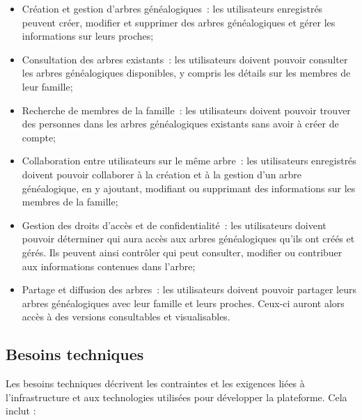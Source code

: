 \begin{itemize}

  \item Création et gestion d’arbres généalogiques : les utilisateurs enregistrés
    peuvent créer, modifier et supprimer des arbres généalogiques et gérer les
    informations sur leurs proches;

  \item Consultation des arbres existants : les utilisateurs doivent pouvoir
    consulter les arbres généalogiques disponibles, y compris les détails sur
    les membres de leur famille;

  \item Recherche de membres de la famille : les utilisateurs doivent pouvoir
    trouver des personnes dans les arbres généalogiques existants sans avoir à
    créer de compte;

  \item Collaboration entre utilisateurs sur le même arbre : les utilisateurs
    enregistrés doivent pouvoir collaborer à la création et à la gestion d’un
    arbre généalogique, en y ajoutant, modifiant ou supprimant des informations
    sur les membres de la famille;

  \item Gestion des droits d’accès et de confidentialité : les utilisateurs doivent
    pouvoir déterminer qui aura accès aux arbres généalogiques qu’ils ont créés et
    gérés. Ils peuvent ainsi contrôler qui peut consulter, modifier ou contribuer
    aux informations contenues dans l’arbre;

  \item Partage et diffusion des arbres : les utilisateurs doivent pouvoir partager
    leurs arbres généalogiques avec leur famille et leurs proches.
    Ceux-ci auront alors accès à des versions consultables et visualisables.

\end{itemize}

\subsection{Besoins techniques}
Les besoins techniques décrivent les contraintes et les exigences liées à l’infrastructure
et aux technologies utilisées pour développer la plateforme. Cela inclut :

